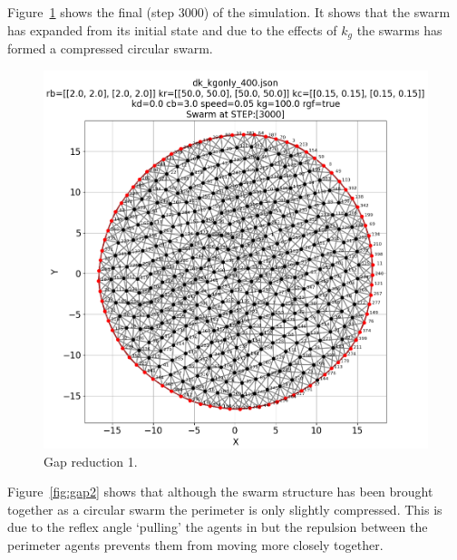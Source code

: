 \documentclass[12pt,a4paper]{IEEEtran}
\newcommand{\kg}{\mathit{k_{g}}}
\begin{document}
Figure~\ref{fig:gap1} shows the final (step 3000) of the simulation. It shows that the swarm has expanded from its initial state and due to the effects of $\kg$ the swarms has formed a compressed circular swarm.

\begin{figure}[H]
	\begin{center}
		\includegraphics[width=1.0\linewidth]{figures/gap1}
	\end{center}
	\caption{Gap reduction 1. \label{fig:gap1}}
\end{figure}

Figure~\ref{fig:gap2} shows that although the swarm structure has been brought together as a circular swarm the perimeter is only slightly compressed. This is due to the reflex angle `pulling' the agents in but the repulsion between the perimeter agents prevents them from moving more closely together. 
\end{document}
